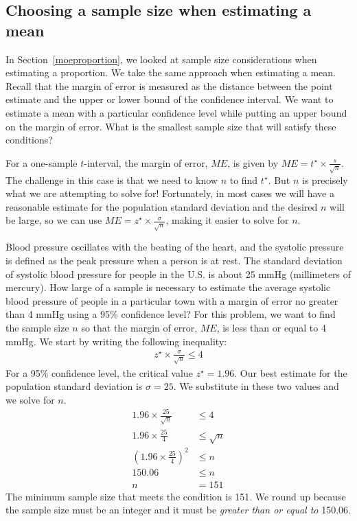 \D{\newpage}

\subsection{Choosing a sample size when estimating a mean}
\label{findingASampleSizeForACertainME}

In Section~\ref{moeproportion}, we looked at sample size considerations when estimating a proportion.  We take the same approach when estimating a mean.  Recall that the margin of error is measured as the distance between the point estimate and the upper or lower bound of the confidence interval.  We want to estimate a mean with a particular confidence level while putting an upper bound on the margin of error.  What is the smallest sample size that will satisfy these conditions?

For a one-sample $t$-interval, the margin of error, $ME$, is given by $ME = t^{\star}\times\frac{s}{\sqrt{n}}$.  The challenge in this case is that we need to know $n$ to find $t^{\star}$.  But $n$ is precisely what we are attempting to solve for!  Fortunately, in most cases we will have a reasonable estimate for the population standard deviation and the desired $n$ will be large, so we can use $ME = z^{\star}\times\frac{\sigma}{\sqrt{n}}$, making it easier to solve for $n$.   

\begin{examplewrap}
\begin{nexample}{Blood pressure oscillates with the beating of the heart, and the systolic pressure is defined as the peak pressure when a person is at rest. The standard deviation of systolic blood pressure for people in the U.S. is about 25 mmHg (millimeters of mercury).  How large of a sample is necessary to estimate the average systolic blood pressure of people in a particular town with a margin of error no greater than 4 mmHg using a 95\% confidence level?}\label{sampleSizeComputationForSystolicBloodPressure}
 For this problem, we want to find the sample size $n$ so that the margin of error, $ME$, is less than or equal to 4 mmHg.  We start by writing the following inequality:\vspace{-1mm}
\begin{align*}
z^{\star}\times \frac{\sigma}{\sqrt{n}} \leq 4
\end{align*}
For a 95\% confidence level, the critical value $z^{\star}=1.96$.  Our best estimate for the population standard deviation is $\sigma = 25$.  We substitute in these two values and we solve for $n$.
\begin{align*}
1.96\times\frac{25}{\sqrt{n}}
	&\leq 4 \\
1.96\times\frac{25}{4} &\leq \sqrt{n} \\
\left(1.96\times\frac{25}{4}\right)^2 &\leq n \\
150.06 &\leq n \\
 n &= 151
\end{align*}
The minimum sample size that meets the condition is 151. We round up because the sample size must be an integer and it must be \emph{greater than or equal to} 150.06.
\end{nexample}
\end{examplewrap}


